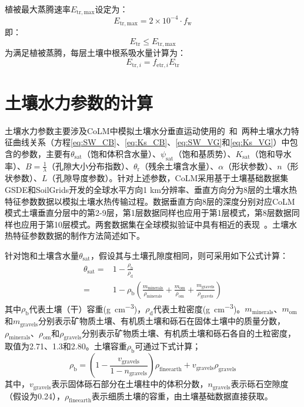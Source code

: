 植被最大蒸腾速率$E_{\mathrm{tr,max}}$设定为：
\begin{equation}
  {E}_{\mathrm{ {tr,max }}}=2 \times 10^{-4} \cdot f_{\mathrm{w}}
\end{equation}
即：
\begin{equation}
  {E}_{\mathrm{{tr}}} \leqslant {E}_{\mathrm{{tr,max}}}
\end{equation}
为满足植被蒸腾，每层土壤中根系吸水量计算为：
\begin{equation}
  {E}_{\mathrm{tr},i} = {f}_{\mathrm{ {etr }}, {i}}{E}_{\mathrm{tr}}
\end{equation}

\section{土壤水力参数的计算}\label{sec_hydropar}
土壤水力参数主要涉及CoLM中模拟土壤水分垂直运动使用的~\citet{campbell1974}和~\citet{van1980closed}两种土壤水力特征曲线关系（方程\eqref{eq:SW_CB}、\eqref{eq:Ks_CB}、\eqref{eq:SW_VG}和\eqref{eq:Ks_VG}）中包含的参数，主要有$\theta_{\mathrm {sat}} $（饱和体积含水量）、$\psi_{\mathrm {sat}} $（饱和基质势）、$K_{\mathrm {sat}} $（饱和导水率）、$B=\frac{1}{\lambda}$（孔隙大小分布指数）、$\theta_{\mathrm {r}} $（残余土壤含水量）、$\alpha$（形状参数）、$n$（形状参数）、$L$（孔隙导度参数）。针对上述参数，CoLM采用基于土壤基础数据集GSDE和SoilGrids开发的全球水平方向1 km分辨率、垂直方向分为8层的土壤水热特征参数数据以模拟土壤水热传输过程。数据垂直方向8层的深度分别对应CoLM模式土壤垂直分层中的第2-9层，第1层数据同样也应用于第1层模式，第8层数据同样也应用于第10层模式。两套数据集在全球模拟验证中具有相近的表现~\citep{李文耀2020土壤}。土壤水热特征参数数据的制作方法简述如下。

针对饱和土壤含水量$\theta_{\mathrm {sat}} $，假设其与土壤孔隙度相同，则可采用如下公式计算：
\begin{equation}
  \begin{aligned}
    \theta_{\mathrm {sat}}  =& 1-\frac{\rho_{\mathrm {b}} }{\rho_{\mathrm {d}} }\\
    =& 1-\rho_{\mathrm {b}} \left(\frac{m_{\mathrm{minerals}}}{\rho_{\mathrm{minerals}}}+\frac{m_{\mathrm{om}}}{\rho_{\mathrm{om}}}+\frac{m_{\mathrm{gravels}}}{\rho_{\mathrm{gravels}}}\right)
  \end{aligned}
\end{equation}
其中$\rho_{\mathrm {b}} $代表土壤（干）容重(\unit{g.cm^{-3}})，$\rho_{\mathrm {d}} $代表土粒密度(\unit{g.cm^{-3}})。$m_{\mathrm{minerals}}$、$m_{\mathrm{om}}$和$m_{\mathrm{gravels}}$分别表示矿物质土壤、有机质土壤和砾石在固体土壤中的质量分数，$\rho_{\mathrm{minerals}}$、$\rho_{\mathrm{om}}$和$\rho_{\mathrm{gravels}}$分别表示矿物质土壤、有机质土壤和砾石各自的土粒密度，取值为2.71、1.3和2.80。土壤容重$\rho_{\mathrm {b}} $可通过下式计算；$$\rho_{\mathrm {b}} =\left(1-\frac{v_{\mathrm{gravels}}}{1-n_{\mathrm{gravels}}}\right)\rho_{\mathrm{fineearth}}+v_{\mathrm{gravels}}\rho_{\mathrm{gravels}}$$
其中，$v_{\mathrm{gravels}}$表示固体砾石部分在土壤柱中的体积分数，$n_{\mathrm{gravels}}$表示砾石空隙度（假设为0.24），$\rho_{\mathrm{fineearth}}$表示细质土壤的容重，由土壤基础数据直接获取。

